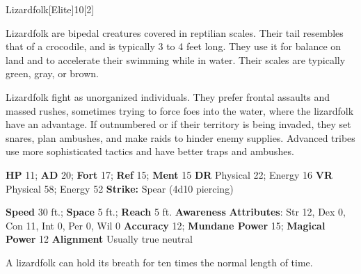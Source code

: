  \begin{monsection}{Lizardfolk}[Elite]{10}[2]
    \vspace{-1em}\vspace{-1em}
    \vspace{0em}

    
    Lizardfolk are bipedal creatures covered in reptilian scales.
    Their tail resembles that of a crocodile, and is typically 3 to 4 feet long.
    They use it for balance on land and to accelerate their swimming while in water.
    Their scales are typically green, gray, or brown.

    Lizardfolk fight as unorganized individuals.
    They prefer frontal assaults and massed rushes, sometimes trying to force foes into the water, where the lizardfolk have an advantage.
    If outnumbered or if their territory is being invaded, they set snares, plan ambushes, and make raids to hinder enemy supplies.
    Advanced tribes use more sophisticated tactics and have better traps and ambushes.
  
    

    \begin{spellcontent}
      \begin{spelltargetinginfo}
        \pari \textbf{HP} 11;
          \textbf{AD} 20;
          \textbf{Fort} 17;
          \textbf{Ref} 15;
          \textbf{Ment} 15
        \pari \textbf{DR} Physical 22; Energy 16
        \pari \textbf{VR} Physical 58; Energy 52
        \pari \textbf{Strike:}
            Spear  (4d10 piercing)
      \end{spelltargetinginfo}
    \end{spellcontent}
    \begin{monsterfooter}
      \pari \textbf{Speed} 30 ft.;
        \textbf{Space} 5 ft.;
        \textbf{Reach} 5 ft.
      \pari \textbf{Awareness} 
      \pari \textbf{Attributes}:
        Str 12, Dex 0,
        Con 11, Int 0,
        Per 0, Wil 0
      \pari \textbf{Accuracy} 12;
        \textbf{Mundane Power} 15;
      \textbf{Magical Power} 12
      \pari \textbf{Alignment} Usually true neutral
    \end{monsterfooter}
  \end{monsection}
   A lizardfolk can hold its breath for ten times the normal length of time.
  
